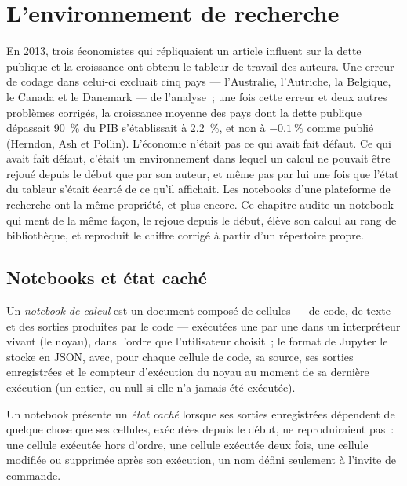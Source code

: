 \chapter{L'environnement de recherche}\label{ch:pl:the-research-environment}

En 2013, trois économistes qui répliquaient un article influent sur la dette publique et la croissance ont obtenu le tableur de travail des auteurs. Une erreur de codage
dans celui-ci excluait cinq pays --- l'Australie, l'Autriche, la Belgique, le Canada et le Danemark --- de l'analyse~; une fois cette erreur et deux autres
problèmes corrigés, la croissance moyenne des pays dont la dette publique dépassait 90~\% du PIB s'établissait à 2.2~\%, et non à $-0.1~\%$ comme publié (Herndon,
Ash et Pollin). L'économie n'était pas ce qui avait fait défaut. Ce qui avait fait défaut, c'était un environnement dans lequel un calcul ne pouvait être rejoué depuis le début
que par son auteur, et même pas par lui une fois que l'état du tableur s'était écarté de ce qu'il affichait. Les
notebooks d'une plateforme de recherche ont la même propriété, et plus encore. Ce chapitre audite un notebook qui ment de la même façon, le rejoue depuis le début,
élève son calcul au rang de bibliothèque, et reproduit le chiffre corrigé à partir d'un répertoire propre.

\section{Notebooks et état caché}

\begin{definition}\label{def:pl:the-research-environment:notebook}
Un \emph{notebook de calcul} est un document composé de cellules --- de code, de texte et des sorties produites par le code ---
exécutées une par une dans un interpréteur vivant (le noyau), dans l'ordre que l'utilisateur choisit~; le format de Jupyter le stocke en JSON, avec, pour chaque
cellule de code, sa source, ses sorties enregistrées et le compteur d'exécution du noyau au moment de sa dernière exécution (un entier, ou null si elle n'a jamais été exécutée).
\end{definition}

\begin{definition}\label{def:pl:the-research-environment:hidden}
Un notebook présente un \emph{état caché} lorsque ses sorties enregistrées dépendent de quelque chose que ses cellules, exécutées depuis le début, ne
reproduiraient pas~: une cellule exécutée hors d'ordre, une cellule exécutée deux fois, une cellule modifiée ou supprimée après son exécution, un nom défini seulement à l'invite de commande.
\end{definition}

